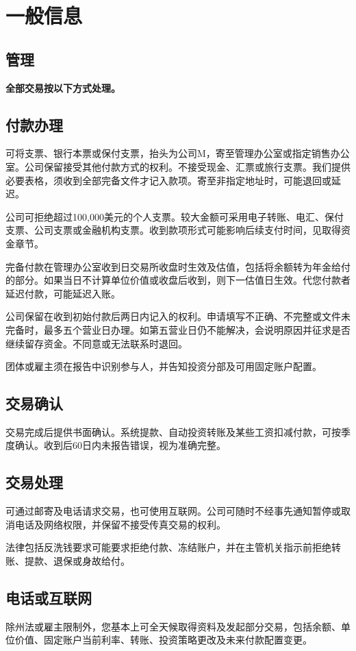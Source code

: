 \documentclass[UTF8,fontset=none,11pt,a4paper]{ctexart}
\begin{document}
\section*{一般信息}
\subsection*{管理}
\textbf{全部交易按以下方式处理。}


\subsection*{付款办理}
可将支票、银行本票或保付支票，抬头为公司M，寄至管理办公室或指定销售办公室。公司保留接受其他付款方式的权利。不接受现金、汇票或旅行支票。我们提供必要表格，须收到全部完备文件才记入款项。寄至非指定地址时，可能退\allowbreak\mbox{回或延迟。}


公司可拒绝超过100,000美元的个人支票。较大金额可采用电子转账、电汇、保付支票、公司支票或金融机构支票。收到款项形式可能影响后续支付时间，见取得\allowbreak\mbox{资金章节。}


完备付款在管理办公室收到日交易所收盘时生效及估值，包括将余额转为年金给付的部分。如果当日不计算单位价值或收盘后收到，则下一估值日生效。代您付款者延迟付款，可能\allowbreak\mbox{延迟入账。}


公司保留在收到初始付款后两日内记入的权利。申请填写不正确、不完整或文件未完备时，最多五个营业日办理。如第五营业日仍不能解决，会说明原因并征求是否继续留存资金。不同意或无法联\allowbreak\mbox{系时退回。}


团体或雇主须在报告中识别参与人，并告知投资分部及可用固定\allowbreak\mbox{账户配置。}


\subsection*{交易确认}
交易完成后提供书面确认。系统提款、自动投资转账及某些工资扣减付款，可按季度确认。收到后60日内未报告错误，视为\allowbreak\mbox{准确完整。}


\subsection*{交易处理}
可通过邮寄及电话请求交易，也可使用互联网。公司可随时不经事先通知暂停或取消电话及网络权限，并保留不接受传真交\allowbreak\mbox{易的权利。}


法律包括反洗钱要求可能要求拒绝付款、冻结账户，并在主管机关指示前拒绝转账、提款、退保或\allowbreak\mbox{身故给付。}


\subsection*{电话或互联网}
除州法或雇主限制外，您基本上可全天候取得资料及发起部分交易，包括余额、单位价值、固定账户当前利率、转账、投资策略更改及未来付款\allowbreak\mbox{配置变更。}
\end{document}
